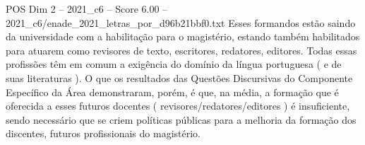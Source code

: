 \begin{textsample}{POS Dim 2 – 2021\_c6 – Score 6.00 – 2021\_c6/enade\_2021\_letras\_por\_d96b21bbf0.txt}
Esses formandos estão saindo da universidade com a habilitação para o magistério, estando também habilitados para atuarem como revisores de texto, escritores, redatores, editores.
Todas essas profissões têm em comum a exigência do domínio da língua portuguesa ( e de suas literaturas ).
O que os resultados das Questões Discursivas do Componente Específico da Área demonstraram, porém, é que, na média, a formação que é oferecida a esses futuros docentes ( revisores/redatores/editores ) é insuficiente, sendo necessário que se criem políticas públicas para a melhoria da formação dos discentes, futuros profissionais do magistério.

\end{textsample}
